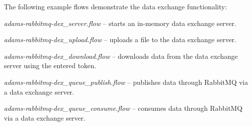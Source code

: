 \documentclass[a4paper]{book}
\begin{document}
\noindent The following example flows demonstrate the data exchange functionality:
\begin{tight_itemize}
  \item \textit{adams-rabbitmq-dex\_server.flow} -- starts an in-memory data exchange server.
  \item \textit{adams-rabbitmq-dex\_upload.flow} -- uploads a file to the data exchange server.
  \item \textit{adams-rabbitmq-dex\_download.flow} -- downloads data from the data exchange server using the entered token.
  \item \textit{adams-rabbitmq-dex\_queue\_publish.flow} -- publishes data through RabbitMQ via a data exchange server.
  \item \textit{adams-rabbitmq-dex\_queue\_consume.flow} -- consumes data through RabbitMQ via a data exchange server.
\end{tight_itemize}


\end{document}
